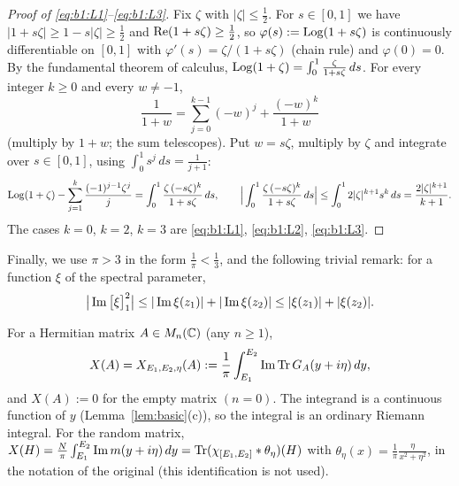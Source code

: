 \begin{proof}[Proof of \eqref{eq:b1:L1}--\eqref{eq:b1:L3}]
Fix $\zeta$ with $|\zeta|\le\frac12$. For $s\in[0,1]$ we have $|1+s\zeta|\ge1-s|\zeta|\ge\frac12$ and $\operatorname{Re}(1+s\zeta)\ge\frac12$, so
$\varphi(s):=\operatorname{Log}(1+s\zeta)$ is continuously differentiable on $[0,1]$ with $\varphi'(s)=\zeta/(1+s\zeta)$ (chain rule) and $\varphi(0)=0$.
By the fundamental theorem of calculus, $\operatorname{Log}(1+\zeta)=\int_0^1\frac{\zeta}{1+s\zeta}\,ds$. For every integer $k\ge0$ and every $w\ne-1$,
\[
\frac1{1+w}=\sum_{j=0}^{k-1}(-w)^j+\frac{(-w)^k}{1+w}
\]
(multiply by $1+w$; the sum telescopes). Put $w=s\zeta$, multiply by $\zeta$ and integrate over $s\in[0,1]$, using $\int_0^1s^j\,ds=\frac1{j+1}$:
\[
\operatorname{Log}(1+\zeta)-\sum_{j=1}^{k}\frac{(-1)^{j-1}\zeta^j}{j}=\int_0^1\frac{\zeta\,(-s\zeta)^k}{1+s\zeta}\,ds,\qquad
\Big|\int_0^1\frac{\zeta\,(-s\zeta)^k}{1+s\zeta}\,ds\Big|\le\int_0^12|\zeta|^{k+1}s^k\,ds=\frac{2|\zeta|^{k+1}}{k+1}.
\]
The cases $k=0$, $k=2$, $k=3$ are \eqref{eq:b1:L1}, \eqref{eq:b1:L2}, \eqref{eq:b1:L3}.
\end{proof}

Finally, we use $\pi>3$ in the form $\frac1\pi<\frac13$, and the following trivial remark: for a function $\xi$ of the spectral parameter,
\begin{equation}\label{eq:b1:br}
\big|\operatorname{Im}\big[\xi\big]_{1}^{2}\big|\le|\operatorname{Im}\xi(z_1)|+|\operatorname{Im}\xi(z_2)|\le|\xi(z_1)|+|\xi(z_2)|.
\end{equation}

\begin{definition}\label{def:X}
For a Hermitian matrix $A\in M_n(\mathbb{C})$ (any $n\ge1$),
\[
X(A)=X_{E_1,E_2,\eta}(A):=\frac1\pi\int_{E_1}^{E_2}\operatorname{Im}\operatorname{Tr} G_A(y+i\eta)\,dy ,
\]
and $X(A):=0$ for the empty matrix $(n=0)$. The integrand is a continuous function of $y$ (Lemma~\ref{lem:basic}(c)), so the integral is
an ordinary Riemann integral. For the random matrix, $X(H)=\frac N\pi\int_{E_1}^{E_2}\operatorname{Im} m(y+i\eta)\,dy=\operatorname{Tr}(\chi_{[E_1,E_2]}*\theta_\eta)(H)$
with $\theta_\eta(x)=\frac1\pi\frac{\eta}{x^2+\eta^2}$, in the notation of the original (this identification is not used).
\end{definition}

